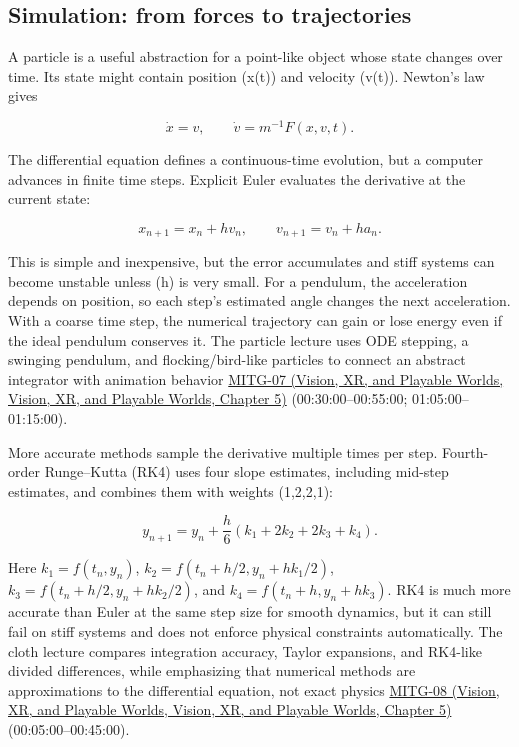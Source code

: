 \subsection{Simulation: from forces to trajectories}\label{04-visual-computing-ii-ch029-simulation-from-forces-to-trajectories}

A particle is a useful abstraction for a point-like object whose state changes over time. Its state might contain position (x(t)) and velocity (v(t)). Newton's law gives

\[
\dot{x}=v,\qquad \dot{v}=m^{-1}F(x,v,t).
\]

The differential equation defines a continuous-time evolution, but a computer advances in finite time steps. Explicit Euler evaluates the derivative at the current state:

\[
x_{n+1}=x_n+h v_n,\qquad v_{n+1}=v_n+h a_n.
\]

This is simple and inexpensive, but the error accumulates and stiff systems can become unstable unless (h) is very small. For a pendulum, the acceleration depends on position, so each step's estimated angle changes the next acceleration. With a coarse time step, the numerical trajectory can gain or lose energy even if the ideal pendulum conserves it. The particle lecture uses ODE stepping, a swinging pendulum, and flocking/bird-like particles to connect an abstract integrator with animation behavior \href{../07-Vision-XR-and-Playable-Worlds/main.pdf\#nameddest=04-visual-computing-ii-ch036-mitg-07---particle-systems}{MITG-07 (Vision, XR, and Playable Worlds, Vision, XR, and Playable Worlds, Chapter 5)} (00:30:00--00:55:00; 01:05:00--01:15:00).

More accurate methods sample the derivative multiple times per step. Fourth-order Runge--Kutta (RK4) uses four slope estimates, including mid-step estimates, and combines them with weights (1,2,2,1):

\[
y_{n+1}=y_n+\frac{h}{6}(k_1+2k_2+2k_3+k_4).
\]

Here \(k_1=f(t_n,y_n)\), \(k_2=f(t_n+h/2,y_n+hk_1/2)\), \(k_3=f(t_n+h/2,y_n+hk_2/2)\), and \(k_4=f(t_n+h,y_n+hk_3)\). RK4 is much more accurate than Euler at the same step size for smooth dynamics, but it can still fail on stiff systems and does not enforce physical constraints automatically. The cloth lecture compares integration accuracy, Taylor expansions, and RK4-like divided differences, while emphasizing that numerical methods are approximations to the differential equation, not exact physics \href{../07-Vision-XR-and-Playable-Worlds/main.pdf\#nameddest=04-visual-computing-ii-ch036-mitg-08---cloth-simulation}{MITG-08 (Vision, XR, and Playable Worlds, Vision, XR, and Playable Worlds, Chapter 5)} (00:05:00--00:45:00).

